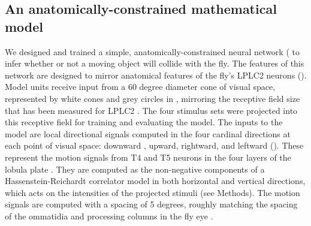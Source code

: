 \documentclass[pdftex,9pt,lineno]{elife}
\begin{document}
\begin{figure}
\label{fig:stimuliFlow}
\label{figsupp:sf1}
\end{figure}


\subsection{An anatomically-constrained mathematical model}

We designed and trained a simple, anatomically-constrained neural network ( to infer whether or not a moving object will collide with the fly. The features of this network are designed to mirror anatomical features of the fly's LPLC2 neurons (). Model units receive input from a 60 degree diameter cone of visual space, represented by white cones and grey circles in , mirroring the receptive field size that has been measured for LPLC2 \citep{klapoetke2017ultra}. The four stimulus sets were projected into this receptive field for training and evaluating the model. The inputs to the model are local directional signals computed in the four cardinal directions at each point of visual space: downward , upward, rightward, and leftward (). These represent the motion signals from T4 and T5 neurons in the four layers of the lobula plate \citep{maisak2013directional}. They are computed as the non-negative components of a Hassenstein-Reichardt correlator model \citep{hassenstein1956systemtheoretische} in both horizontal and vertical directions, which acts on the intensities of the projected stimuli (see Methods). The motion signals are computed with a spacing of 5 degrees, roughly matching the spacing of the ommatidia and processing columns in the fly eye \citep{stavenga2003angular}.
\end{document}
